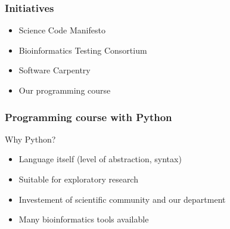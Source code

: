 \documentclass[slidestop]{beamer}
\begin{document}
\begin{frame}
  \frametitle{Initiatives}
  \begin{itemize}
    \item Science Code Manifesto
    \item Bioinformatics Testing Consortium
    \item Software Carpentry
    \item Our programming course
  \end{itemize}
\end{frame}

{
  \frame{}
}

\begin{frame}
  \frametitle{Programming course with Python}
  Why Python?
  \begin{itemize}
    \item Language itself (level of abstraction, syntax)
    \item Suitable for exploratory research
    \item Investement of scientific community and our department
    \item Many bioinformatics tools available
  \end{itemize}
\end{frame}
\end{document}

